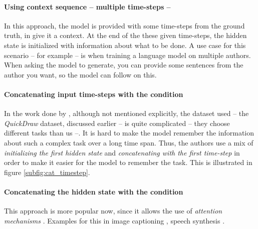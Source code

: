\paragraph{Using context sequence -- multiple time-steps --} In this approach, the model is provided with some time-steps from the ground truth, in give it a context. At the end of the these given time-steps, the hidden state is initialized with information about what to be done. A use case for this scenario -- for example -- is when training a language model on multiple authors. When asking the model to generate, you can provide some sentences from the author you want, so the model can follow on this.

\paragraph{Concatenating input time-steps with the condition} In the work done by \citep{ha2017neural}, although not mentioned explicitly, the dataset used -- the \textit{QuickDraw} dataset, discussed earlier -- is quite complicated -- they choose different tasks than us --. It is hard to make the model remember the information about such a complex task over a long time span. Thus, the authors use a mix of \textit{initializing the first hidden state} and \textit{concatenating with the first time-step} in order to make it easier for the model to remember the task. This is illustrated in figure \ref{subfig:cat_timestep}.

\paragraph{Concatenating the hidden state with the condition} This approach is more popular now, since it allows the use of \textit{attention mechanisms} \citep{NIPS2010_4089,denil2012learning}. Examples for this in image captioning \citep{xu2015show}, speech synthesis \citep{wang2017tacotron}.

